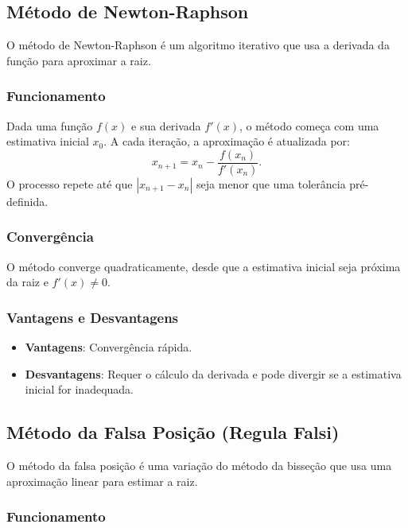 \subsection{\textbf{Método de Newton-Raphson}}

O método de Newton-Raphson é um algoritmo iterativo que usa a derivada da função
para aproximar a raiz.\cite{moreira2011curso}~\cite{bartle2010introduction}

\subsubsection{Funcionamento}

Dada uma função \( f(x) \) e sua derivada \( f'(x) \), o método começa com uma
estimativa inicial \( x_0 \). A cada iteração, a aproximação é atualizada por:
\[
	x_{n+1} = x_n - \frac{f(x_n)}{f'(x_n)}.
\]
O processo repete até que \( |x_{n+1} - x_n| \) seja menor que uma tolerância
pré-definida.

\subsubsection{Convergência}

O método converge quadraticamente, desde que a estimativa inicial seja próxima
da raiz e \( f'(x) \neq 0 \).

\subsubsection{Vantagens e Desvantagens}

\begin{itemize}
	\item \textbf{Vantagens}: Convergência rápida.
	\item \textbf{Desvantagens}: Requer o cálculo da derivada e pode divergir se
	      a estimativa inicial for inadequada.
\end{itemize}

\subsection{\textbf{Método da Falsa Posição (Regula Falsi)}}

O método da falsa posição é uma variação do método da bisseção que usa uma
aproximação linear para estimar a raiz.\cite{bartle1983elementos}

\subsubsection{Funcionamento}


